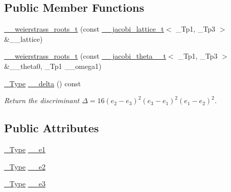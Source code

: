 \subsection*{Public Member Functions}
\begin{DoxyCompactItemize}
\item 
\hyperlink{structstd_1_1____detail_1_1____weierstrass__roots__t_ae198e5213d170ad03e1b33f2a2bd4755}{\+\_\+\+\_\+weierstrass\+\_\+roots\+\_\+t} (const \hyperlink{structstd_1_1____detail_1_1____jacobi__lattice__t}{\+\_\+\+\_\+jacobi\+\_\+lattice\+\_\+t}$<$ \+\_\+\+Tp1, \+\_\+\+Tp3 $>$ \&\+\_\+\+\_\+lattice)
\item 
\hyperlink{structstd_1_1____detail_1_1____weierstrass__roots__t_a032b7fead8c0379bcaf4594f40b78c28}{\+\_\+\+\_\+weierstrass\+\_\+roots\+\_\+t} (const \hyperlink{structstd_1_1____detail_1_1____jacobi__theta__0__t}{\+\_\+\+\_\+jacobi\+\_\+theta\+\_\+\_\+t}$<$ \+\_\+\+Tp1, \+\_\+\+Tp3 $>$ \&\+\_\+\+\_\+theta0, \+\_\+\+Tp1 \+\_\+\+\_\+omega1)
\item 
\hyperlink{structstd_1_1____detail_1_1____weierstrass__roots__t_acda3e0386962aea322dea870977b67ed}{\+\_\+\+Type} \hyperlink{structstd_1_1____detail_1_1____weierstrass__roots__t_a03182b9fb82a1895dde603836e659776}{\+\_\+\+\_\+delta} () const
\begin{DoxyCompactList}\small\item\em Return the discriminant $ \Delta = 16(e_2 - e_3)^2(e_3 - e_1)^2(e_1 - e_2)^2 $. \end{DoxyCompactList}\end{DoxyCompactItemize}
\subsection*{Public Attributes}
\begin{DoxyCompactItemize}
\item 
\hyperlink{structstd_1_1____detail_1_1____weierstrass__roots__t_acda3e0386962aea322dea870977b67ed}{\+\_\+\+Type} \hyperlink{structstd_1_1____detail_1_1____weierstrass__roots__t_a65ec7bd3b4996c0fac31474aeb7fcb83}{\+\_\+\+\_\+e1}
\item 
\hyperlink{structstd_1_1____detail_1_1____weierstrass__roots__t_acda3e0386962aea322dea870977b67ed}{\+\_\+\+Type} \hyperlink{structstd_1_1____detail_1_1____weierstrass__roots__t_a2c85c7105b24d122894cb0db93a271a1}{\+\_\+\+\_\+e2}
\item 
\hyperlink{structstd_1_1____detail_1_1____weierstrass__roots__t_acda3e0386962aea322dea870977b67ed}{\+\_\+\+Type} \hyperlink{structstd_1_1____detail_1_1____weierstrass__roots__t_ace1c2bcb3e385eee959955ea4e4d9f11}{\+\_\+\+\_\+e3}
\end{DoxyCompactItemize}


